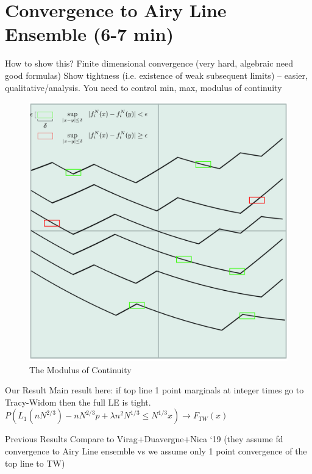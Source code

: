 \documentclass[9pt,t]{beamer}
\begin{document}
\section{Convergence to Airy Line Ensemble (6-7 min)}
\begin{frame}{How to show this?}
Finite dimensional convergence (very hard, algebraic need good formulas)
Show tightness (i.e. existence of weak subsequent limits) -- easier, qualitative/analysis. You need to control min, max, modulus of continuity
\begin{figure}
	\includegraphics[height=0.5\textheight]{graphics/TempModulusCont.jpg}
	\caption{The Modulus of Continuity}
\end{figure}

\end{frame}
\begin{frame}{Our Result}
Main result here: if top line 1 point marginals at integer times go to Tracy-Widom then the full LE is tight. 
$P(L_1(nN^{2/3}) - nN^{2/3} p + \lambda n^2 N^{1/3} \leq N^{1/3} x) \to F_{TW}(x)$
\end{frame}
\begin{frame}{Previous Results}
Compare to Virag+Duavergne+Nica ‘19 (they assume fd convergence to Airy Line ensemble vs we assume only 1 point convergence of the top line to TW)
\end{frame}
\end{document}
